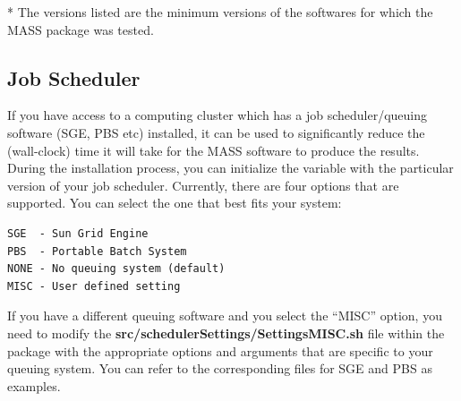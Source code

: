 \documentclass[letterpaper,10pt,english]{sphinxhowto}
\begin{document}
* The versions listed are the minimum versions of the softwares for which the MASS package was tested.


\subsection{Job Scheduler}
\label{installation:job-scheduler}
If you have access to a computing cluster which has a job scheduler/queuing software (SGE, PBS etc) installed, it
can be used to significantly reduce the (wall-clock) time it will take for the MASS software to produce the results.
During the installation process, you can initialize the  variable with the particular version of your
job scheduler. Currently, there are four options that are supported. You can select the one that best fits your system:

\begin{Verbatim}[commandchars=\\\{\}]
SGE  - Sun Grid Engine
PBS  - Portable Batch System
NONE - No queuing system (default)
MISC - User defined setting
\end{Verbatim}

If you have a different queuing software and you select the ``MISC'' option, you need to modify the
\textbf{src/schedulerSettings/SettingsMISC.sh} file within the package with the appropriate options and arguments that are specific
to your queuing system. You can refer to the corresponding files for SGE and PBS as examples.
\end{document}
